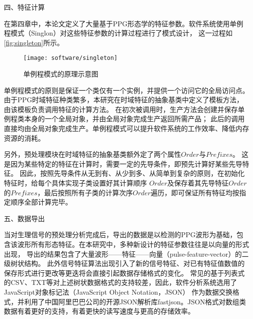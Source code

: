
四、特征计算

在第四章中，本论文定义了大量基于PPG形态学的特征参数。软件系统使用单例程模式（Singlon）对这些特征参数的计算过程进行了模式设计\cite{Li2015,Enrich2018}，
这一过程如\autoref{fig:singleton}所示。

\begin{figure}[htbp]
    \centering
    \texttt{[image: software/singleton]}
    \caption{\label{fig:singleton}单例程模式的原理示意图}
\end{figure}

单例程模式的原则是保证一个类仅有一个实例，并提供一个访问它的全局访问点。
由于PPG时域特征种类繁多，本研究在时域特征的抽象基类中定义了模板方法，
由该模板负责调用特征的计算方法。
在初次被调用时，生产方法会创建并保存单例程类本身的一个全局对象，并由全局对象完成生产返回所需产品；
此后的调用直接均由全局对象完成生产。单例程模式可以提升软件系统的工作效率、降低内存资源的消耗。

另外，预处理模块在时域特征的抽象基类额外定了两个属性$Order$与$Prefixes$。
这是因为某些特定的特征在计算时，需要一定的先导条件，即预先计算好某些先导特征。
因此，按照先导条件从无到有、从少到多、从简单到复杂的原则，在初始化特征时，给每个具体实现子类设置好其计算顺序
$Order$及保存着其先导特征$Order$的$Prefixes$，最后按照所有子类的计算次序$Order$遍历，即可保证所有特征均按指定顺序全部计算完毕。

五、数据导出

当对生理信号的预处理分析完成后，导出的数据是以检测的PPG波形为基础，包含该波形所有形态特征。在本研究中，多种新设计的特征参数往往是以向量的形式出现，
导出的结果包含了大量波形——特征——向量（pulse-feature-vector）的二级树状结构。
此外信号特征算法出现引入了新的信号特征、对已有特征值数值的保存形式进行更改等更迭将会直接引起数据存储格式的变化。
常见的基于列表式的CSV、TXT等对上述树状数据格式的支持较差，因此，软件分析系统选用了JavaScript对象标记法（JavaScript Object Notation，JSON）\cite{json,Crockford2006}
作为数据交换格式，并利用了中国阿里巴巴公司的开源JSON解析库fastjson\cite{fastjson}。JSON格式对数组类数据有着更好的支持，有着更快的读写速度与更高的存储效率\cite{Nurseitov2009}。

